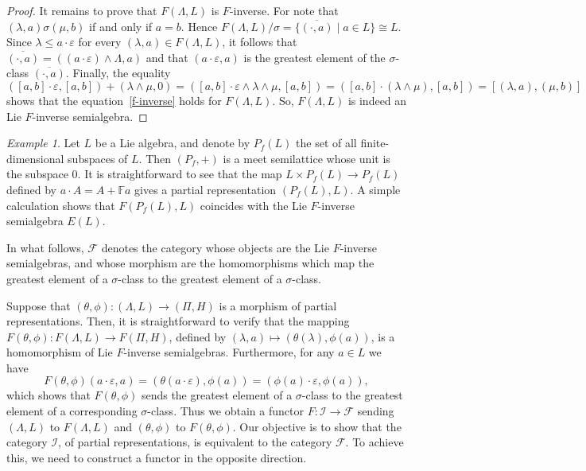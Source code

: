 \documentclass{amsart}
\newcommand{\F}{\mathbb{F}}
\newcommand{\0}{{\vartheta}}
\theoremstyle{definition}
\theoremstyle{remark}
\newtheorem{ex}[thm]{Example}
\numberwithin{equation}{section}
\newtheorem*{Theorem A}{\textbf{Theorem A}}
\newtheorem*{Corollary E}{\textbf{Corollary E}}
\newtheorem*{Corollary F}{\textbf{Corollary F}}
\newtheorem*{Theorem B}{\textbf{Theorem B}}
\newtheorem*{Theorem C}{\textbf{Theorem C}}
\newtheorem*{Theorem D}{\textbf{Theorem B}}
\newtheorem*{p a}{\textbf{Proof of  Theorem A}}
\newtheorem*{p b}{\textbf{Proof of Theorem B}}
\newtheorem*{p c}{\textbf{Proof of  Theorem C}}
\newtheorem*{p d}{\textbf{Proof of  Theorem D}}
\begin{document}
\begin{proof}
It remains to  prove that  $F(\Lambda,L)$ is  $F$-inverse. For note that $(\lambda,a)\sigma(\mu,b)$ if and only if $a=b$. Hence $F(\Lambda,L)/\sigma=
\{\overline{(\cdot,a)}\mid a\in L\}\cong L$. Since $\lambda\leq a\cdot\varepsilon$ for every $(\lambda,a)\in F(\Lambda,L)$, it follows that 
 $\overline{(\cdot,a)}= 
((a\cdot \varepsilon) \wedge \Lambda, a) $ and that $(a\cdot\varepsilon,a)$ is the greatest element of the $\sigma$-class $\overline{(\cdot,a)}.$ Finally, the equality $$([a,b]\cdot \varepsilon,[a,b])+(\lambda\wedge \mu,0)=([a,b]\cdot \varepsilon\wedge \lambda\wedge\mu,[a,b])=([a,b]\cdot (\lambda\wedge \mu),[a,b])=[(\lambda,a),(\mu,b)]$$
shows that the equation~\eqref{f-inverse} holds for $F(\Lambda,L)$. So, $F(\Lambda,L)$ is indeed an Lie $F$-inverse semialgebra.
\end{proof}

\begin{ex}\label{ex-section4}
Let $L$ be a Lie algebra, and denote by $P_f(L)$ the set of all finite-dimensional subspaces of $L$. Then $(P_f,+)$ is a meet semilattice whose unit is the subspace $0$. It is straightforward to see that the map  $L\times P_f(L) \to P_f(L)$ defined by $a\cdot A=A+\F a$ gives a partial representation $(P_f(L),L)$. A simple calculation shows that $F(P_f(L),L)$ coincides with the Lie $F$-inverse semialgebra $E(L)$.
\end{ex}


In what follows,  $\mathcal{F}$ denotes the category whose objects are the Lie $F$-inverse semialgebras, and whose morphism are the homomorphisms which map the greatest element of a $\sigma$-class to the greatest element of a $\sigma$-class.

Suppose that $(\theta,\phi):(\Lambda,L)\to (\Pi,H)$ is a morphism of partial representations. Then, it is straightforward to verify that the mapping $F(\theta,\phi): F(\Lambda,L)\to F(\Pi,H)$, defined by $(\lambda,a)\mapsto (\theta(\lambda),\phi(a))$, is a homomorphism of Lie $F$-inverse semialgebras. Furthermore, for any $a\in L$ we have  
$$F(\theta,\phi)(a\cdot\varepsilon,a)= (\theta(a\cdot \varepsilon ),\phi(a))=(\phi(a)\cdot \varepsilon,\phi(a)),$$ which shows that $F(\theta,\phi)$ sends the greatest element of a $\sigma$-class to the greatest element of a corresponding $\sigma$-class.
 Thus we obtain a functor $F:\mathcal{I} \to \mathcal{F}$ sending $(\Lambda,L)$ to $F(\Lambda,L)$ and $(\theta,\phi)$ to $F(\theta,\phi)$. Our  objective is to show that the category $\mathcal{I}$, of partial representations, is equivalent to the category $\mathcal{F}$. To achieve this, we need to construct a functor in the opposite direction. 
\end{document}

